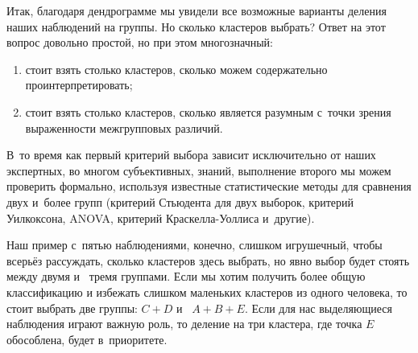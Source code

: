 \documentclass[12pt,a4paper]{article}
\theoremstyle{definition}
\begin{document}
Итак, благодаря дендрограмме мы увидели все возможные варианты деления 
наших наблюдений на группы. Но сколько кластеров выбрать? 
Ответ на этот вопрос довольно простой, но при этом многозначный:
\begin{enumerate}
\item стоит взять столько кластеров, сколько можем содержательно проинтерпретировать;
\item стоит взять столько кластеров, сколько является разумным с~точки зрения выраженности
межгрупповых различий.
\end{enumerate}

В~то время как первый критерий выбора зависит исключительно от наших экспертных, во многом 
субъективных, знаний, выполнение второго мы можем проверить формально, используя 
известные статистические методы для сравнения двух и~более групп (критерий Стьюдента 
для двух выборок, критерий Уилкоксона, ANOVA, критерий Краскелла-Уоллиса и~другие).

Наш пример с~пятью наблюдениями, конечно, слишком игрушечный, чтобы всерьёз 
 рассуждать, сколько кластеров здесь выбрать, но явно выбор будет стоять между двумя и~ 
 тремя группами. Если мы хотим получить более общую классификацию и избежать 
 слишком маленьких кластеров из одного человека, то стоит выбрать две 
 группы: $C+D$ и~ $A+B+E$. Если для нас выделяющиеся наблюдения играют важную роль, то 
деление на три кластера, где точка $E$ обособлена, будет в~приоритете.
\end{document}
